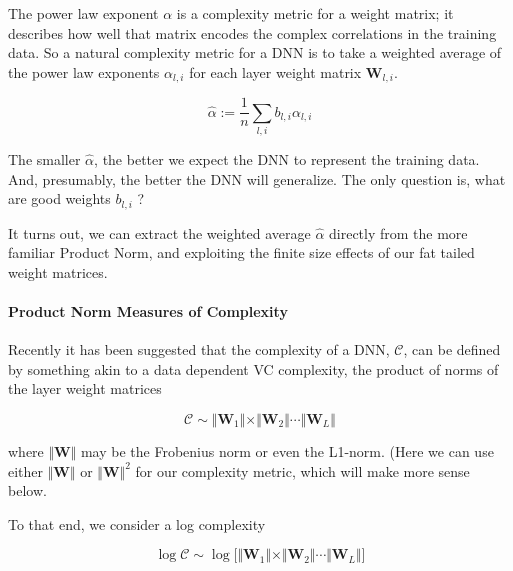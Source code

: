 The power law exponent $\alpha$ is a complexity metric for a weight matrix; it describes how well that matrix encodes the complex correlations in the training data.
So a natural complexity metric for a DNN is to take a weighted average of the power law exponents $\alpha_{l,i}$ for each layer weight matrix $\mathbf{W}_{l,i}$.

$$\hat{\alpha}:=\dfrac{1}{n}\sum_{l,i}b_{l,i}\alpha_{l,i}$$

The smaller $\hat{\alpha}$, the better we expect the DNN to represent the training data. And, presumably, the better the DNN will generalize.
The only question is, what are good weights $b_{l,i}$ ?

It turns out, we can extract the weighted average $\hat{\alpha}$ directly from the more familiar Product Norm, and exploiting the finite size effects of our fat tailed weight matrices.



\paragraph{Product Norm Measures of Complexity}

Recently it has been suggested that the complexity of a DNN, $\mathcal{C}$,  can be defined by something akin to a data dependent VC complexity, the product of norms of the layer weight matrices

$$\mathcal{C}\sim\Vert\mathbf{W}_{1}\Vert\times\Vert\mathbf{W}_{2}\Vert\cdots\Vert\mathbf{W}_{L}\Vert$$

where $\Vert\mathbf{W}\Vert$ may be the Frobenius norm or even the L1-norm.  (Here we can use either  $\Vert\mathbf{W}\Vert$ or $\Vert\mathbf{W}\Vert^{2}$ for our complexity metric, which will make more sense below.

To that end, we consider a log complexity

$$\log\mathcal{C}\sim\log\bigg[\Vert\mathbf{W}_{1}\Vert\times\Vert\mathbf{W}_{2}\Vert\cdots\Vert\mathbf{W}_{L}\Vert\bigg]$$

